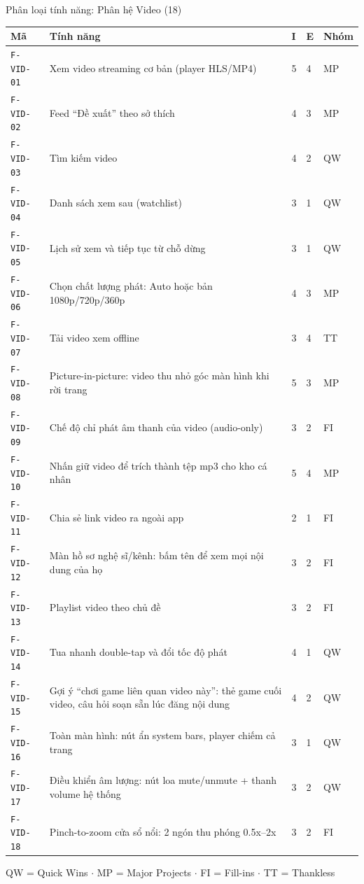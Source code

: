\begin{frame}{Phân loại tính năng: Phân hệ Video (18)}
\begin{center}\tiny
\begin{tabular}{@{}p{1.5cm}p{7.5cm}p{0.3cm}p{0.3cm}p{0.8cm}@{}}
\toprule
\textbf{Mã} & \textbf{Tính năng} & \textbf{I} & \textbf{E} & \textbf{Nhóm} \\
\midrule
\texttt{F-VID-01} & Xem video streaming cơ bản (player HLS/MP4) & 5 & 4 & MP \\
\texttt{F-VID-02} & Feed ``Đề xuất'' theo sở thích & 4 & 3 & MP \\
\texttt{F-VID-03} & Tìm kiếm video & 4 & 2 & QW \\
\texttt{F-VID-04} & Danh sách xem sau (watchlist) & 3 & 1 & QW \\
\texttt{F-VID-05} & Lịch sử xem và tiếp tục từ chỗ dừng & 3 & 1 & QW \\
\texttt{F-VID-06} & Chọn chất lượng phát: Auto hoặc bản 1080p/720p/360p & 4 & 3 & MP \\
\texttt{F-VID-07} & Tải video xem offline & 3 & 4 & TT \\
\texttt{F-VID-08} & Picture-in-picture: video thu nhỏ góc màn hình khi rời trang & 5 & 3 & MP \\
\texttt{F-VID-09} & Chế độ chỉ phát âm thanh của video (audio-only) & 3 & 2 & FI \\
\texttt{F-VID-10} & Nhấn giữ video để trích thành tệp mp3 cho kho cá nhân & 5 & 4 & MP \\
\texttt{F-VID-11} & Chia sẻ link video ra ngoài app & 2 & 1 & FI \\
\texttt{F-VID-12} & Màn hồ sơ nghệ sĩ/kênh: bấm tên để xem mọi nội dung của họ & 3 & 2 & FI \\
\texttt{F-VID-13} & Playlist video theo chủ đề & 3 & 2 & FI \\
\texttt{F-VID-14} & Tua nhanh double-tap và đổi tốc độ phát & 4 & 1 & QW \\
\texttt{F-VID-15} & Gợi ý ``chơi game liên quan video này'': thẻ game cuối video, câu hỏi soạn sẵn lúc đăng nội dung & 4 & 2 & QW \\
\texttt{F-VID-16} & Toàn màn hình: nút ẩn system bars, player chiếm cả trang & 3 & 1 & QW \\
\texttt{F-VID-17} & Điều khiển âm lượng: nút loa mute/unmute + thanh volume hệ thống & 3 & 2 & QW \\
\texttt{F-VID-18} & Pinch-to-zoom cửa sổ nổi: 2 ngón thu phóng 0.5x--2x & 3 & 2 & FI \\
\bottomrule
\end{tabular}
\end{center}
\vfill
{\tiny\color{TextGray} QW = Quick Wins $\cdot$ MP = Major Projects $\cdot$ FI = Fill-ins $\cdot$ TT = Thankless}
\end{frame}

